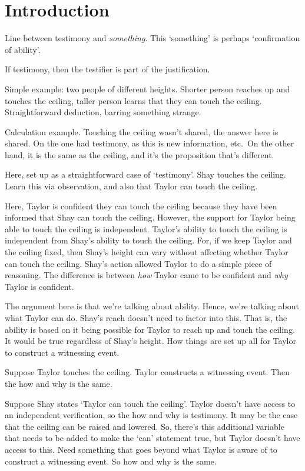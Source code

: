 \documentclass[10pt]{article}
\begin{document}
\newpage


\section{Introduction}
\label{sec:introduction}

Line between testimony and \emph{something}.
This `something' is perhaps `confirmation of ability'.

If testimony, then the testifier is part of the justification.

Simple example: two people of different heights.
Shorter person reaches up and touches the ceiling, taller person learns that they can touch the ceiling.
Straightforward deduction, barring something strange.

Calculation example.
Touching the ceiling wasn't shared, the answer here is shared.
On the one had testimony, as this is new information, etc.\
On the other hand, it is the same as the ceiling, and it's the proposition that's different.

Here, set up as a straightforward case of `testimony'.
Shay touches the ceiling.
Learn this via observation, and also that Taylor can touch the ceiling.

Here, Taylor is confident they can touch the ceiling because they have been informed that Shay can touch the ceiling.
However, the support for Taylor being able to touch the ceiling is independent.
Taylor's ability to touch the ceiling is independent from Shay's ability to touch the ceiling.
For, if we keep Taylor and the ceiling fixed, then Shay's height can vary without affecting whether Taylor can touch the ceiling.
Shay's action allowed Taylor to do a simple piece of reasoning.
The difference is between \emph{how} Taylor came to be confident and \emph{why} Taylor is confident.

The argument here is that we're talking about ability.
Hence, we're talking about what Taylor can do.
Shay's reach doesn't need to factor into this.
That is, the ability is based on it being possible for Taylor to reach up and touch the ceiling.
It would be true regardless of Shay's height.
How things are set up all for Taylor to construct a witnessing event.

Suppose Taylor touches the ceiling.
Taylor constructs a witnessing event.
Then the how and why is the same.

Suppose Shay states `Taylor can touch the ceiling'.
Taylor doesn't have access to an independent verification, so the how and why is testimony.
It may be the case that the ceiling can be raised and lowered.
So, there's this additional variable that needs to be added to make the `can' statement true, but Taylor doesn't have access to this.
Need something that goes beyond what Taylor is aware of to construct a witnessing event.
So how and why is the same.
\end{document}
